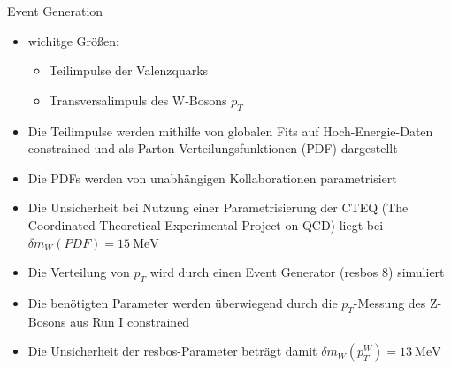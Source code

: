 \documentclass[aspectratio=1610, 9pt]{beamer}
\begin{document}
\begin{frame}{Event Generation}
  \begin{itemize}
    \item wichitge Größen:
    \begin{itemize}
      \item[\rightarrow] Teilimpulse der Valenzquarks
      \item[\rightarrow] Transversalimpuls des W-Bosons $p_T$
    \end{itemize}
    \item Die Teilimpulse werden mithilfe von globalen Fits auf Hoch-Energie-Daten constrained und als Parton-Verteilungsfunktionen (PDF) dargestellt
    \item Die PDFs werden von unabhängigen Kollaborationen parametrisiert
    \item Die Unsicherheit bei Nutzung einer Parametrisierung der CTEQ (The Coordinated Theoretical-Experimental Project on QCD) liegt bei $\delta m_W(PDF) = \SI{15}{\MeV}$
  \end{itemize}




\end{frame}

\begin{frame}
  \begin{itemize}
    \item Die Verteilung von $p_T$ wird durch einen Event Generator (resbos 8) simuliert
    \item Die benötigten Parameter werden überwiegend durch die $p_T$-Messung des Z-Bosons aus Run I constrained
    \item Die Unsicherheit der resbos-Parameter beträgt damit $\delta m_W (p^W_T) = \SI{13}{\MeV}$
  \end{itemize}


\end{frame}
\end{document}
